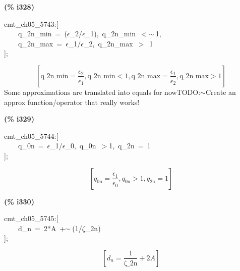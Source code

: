 \documentclass[fleqn]{article}
\begin{document}
\noindent
\begin{minipage}[t]{4.000000em}\color{red}\bfseries
(\% i328)	
\end{minipage}
\begin{minipage}[t]{\textwidth}\color{blue}
cmt\_ch05\_5743:[\\
\ \ \ \ q\_2n\_min\ =\ (\ensuremath{\epsilon}\_2/\ensuremath{\epsilon}\_1),\ q\_2n\_min\ \ensuremath{<}\ensuremath{\sim\ }1,\\
\ \ \ \ q\_2n\_max\ =\ \ensuremath{\epsilon}\_1/\ensuremath{\epsilon}\_2,\ q\_2n\_max\ \ensuremath{>}\ 1\\
];
\end{minipage}
\[\displaystyle \tag{\% o328} 
\left[ \ensuremath{\mathrm{q\_ 2n\_ min}}=\frac{{{\epsilon }_2}}{{{\epsilon }_1}}\operatorname{,}\ensuremath{\mathrm{q\_ 2n\_ min}}\operatorname{<  }1\operatorname{,}\ensuremath{\mathrm{q\_ 2n\_ max}}=\frac{{{\epsilon }_1}}{{{\epsilon }_2}}\operatorname{,}\ensuremath{\mathrm{q\_ 2n\_ max}}\operatorname{>  }1\right] \mbox{}
\]
Some approximations are translated into equals for nowTODO:\ensuremath{\sim }Create an approx function/operator that really works!


\noindent
\begin{minipage}[t]{4.000000em}\color{red}\bfseries
(\% i329)	
\end{minipage}
\begin{minipage}[t]{\textwidth}\color{blue}
cmt\_ch05\_5744:[\\
\ \ \ \ q\_0n\ =\ \ensuremath{\epsilon}\_1/\ensuremath{\epsilon}\_0,\ q\_0n\ \ensuremath{>}1,\ q\_2n\ =\ 1\\
];
\end{minipage}
\[\displaystyle \tag{\% o329} 
\left[ {q_{\ensuremath{\mathrm{0n}}}}=\frac{{{\epsilon }_1}}{{{\epsilon }_0}}\operatorname{,}{q_{\ensuremath{\mathrm{0n}}}}\operatorname{>  }1\operatorname{,}{q_{\ensuremath{\mathrm{2n}}}}=1\right] \mbox{}
\]


\noindent
\begin{minipage}[t]{4.000000em}\color{red}\bfseries
(\% i330)	
\end{minipage}
\begin{minipage}[t]{\textwidth}\color{blue}
cmt\_ch05\_5745:[\\
\ \ \ \ d\_n\ =\ 2*A\ +\ensuremath{\sim\ }(1/\ensuremath{\zeta}\_2n)\\
];
\end{minipage}
\[\displaystyle \tag{\% o330} 
\left[ {d_n}=\frac{1}{\ensuremath{\mathrm{\zeta \_ 2n}}}+2 A\right] \mbox{}
\]
\end{document}

